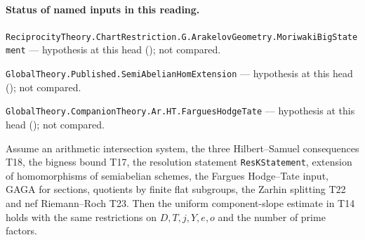 

\paragraph{Status of named inputs in this reading.}
\noindent\nolinkurl{ReciprocityTheory.ChartRestriction.G.ArakelovGeometry.MoriwakiBigStatement} --- hypothesis at this head (); not compared.\par
\noindent\nolinkurl{GlobalTheory.Published.SemiAbelianHomExtension} --- hypothesis at this head (); not compared.\par
\noindent\nolinkurl{GlobalTheory.CompanionTheory.Ar.HT.FarguesHodgeTate} --- hypothesis at this head (); not compared.\par

\begin{formalstatement}\label{sub:T26}

Assume an arithmetic intersection system, the three Hilbert--Samuel
consequences T18, the bigness bound T17, the resolution statement
\nolinkurl{ResKStatement}, extension of homomorphisms of semiabelian
schemes, the Fargues Hodge--Tate input, GAGA for sections, quotients by
finite flat subgroups, the Zarhin splitting T22 and nef Riemann--Roch T23.
Then the uniform component-slope estimate in T14 holds with the same
restrictions on $D,T,j,Y,e,o$ and the number of prime factors.

\end{formalstatement}

